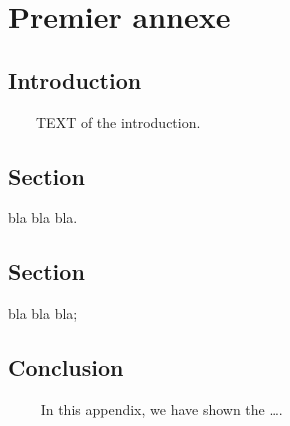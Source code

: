 \chapter{Premier annexe}
\section{Introduction}
~~~~TEXT of the introduction.
\section{Section}
bla bla bla.
\section{Section}
bla bla bla;
\section{Conclusion}
~~~~ In this appendix, we have shown the \ldots.
